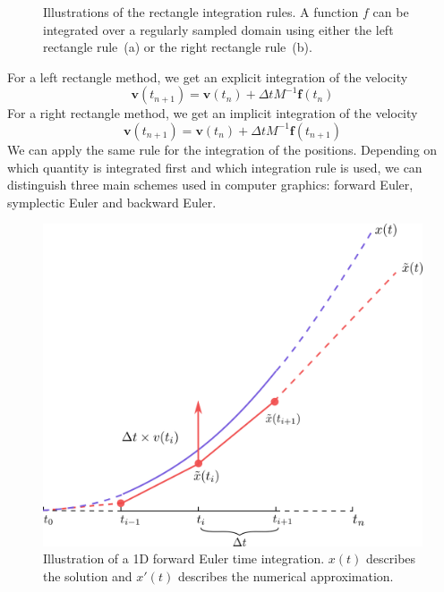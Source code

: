 \begin{figure}[!ht]
\begin{subfigure}[b]{0.46\linewidth}
		\caption{\label{fig:rightRectangleRule}}
	\end{subfigure}
	\caption[STAR mechanics: Rectangle integration rules]{\label{fig:rectangleRules}
		Illustrations of the rectangle integration rules. A function $f$ can be integrated over a regularly sampled domain using either the left rectangle rule~(a) or the right rectangle rule~(b).}
\end{figure}

For a left rectangle method, we get an explicit integration of the velocity
\begin{equation}
\label{eq:explicitIntegration}
\mathbf{v}(t_{n+1}) = \mathbf{v}(t_{n}) + \Delta t M^{-1}\mathbf{f}(t_{n})
\end{equation}
For a right rectangle method, we get an implicit integration of the velocity
\begin{equation}
\label{eq:implicitIntegration}
\mathbf{v}(t_{n+1}) = \mathbf{v}(t_{n}) + \Delta t M^{-1}\mathbf{f}(t_{n+1})
\end{equation}
We can apply the same rule for the integration of the positions.
Depending on which quantity is integrated first and which integration rule is used, we can distinguish three main schemes used in computer graphics: forward Euler, symplectic Euler and backward Euler.
\begin{figure}[!ht]
	\centering
	\includegraphics[scale=0.6]{images/continuum_mechanics/timeIntegration.png}
	\caption[STAR mechanics: Temporal integration]{\label{fig:timeIntegration} 
		Illustration of a 1D forward Euler time integration. 
		$x(t)$ describes the solution and $x'(t)$ describes the numerical approximation.}
\end{figure}
